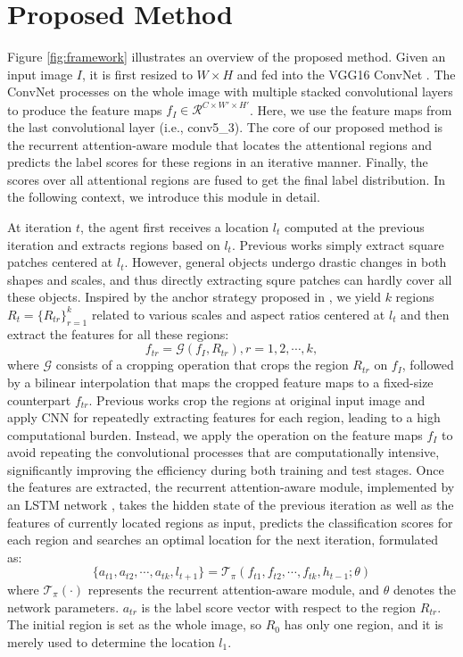 \documentclass[letterpaper]{article} %
\begin{document}
\section{Proposed Method}
Figure \ref{fig:framework} illustrates an overview of the proposed method. Given an input image $I$, it is first resized to $W\times{H}$ and fed into the VGG16 ConvNet \cite{simonyan2014very}. The ConvNet processes on the whole image with multiple stacked convolutional layers to produce the feature maps $f_I\in{\mathcal{R}^{C\times{W'}\times{H'}}}$. Here, we use the feature maps from the last convolutional layer (i.e., conv5\_3). The core of our proposed method is the recurrent attention-aware module that locates the attentional regions and predicts the label scores for these regions in an iterative manner. Finally, the scores over all attentional regions are fused to get the final label distribution. In the following context, we introduce this module in detail.

At iteration $t$, the agent first receives a location $l_t$ computed at the previous iteration and extracts regions based on $l_t$. Previous works \cite{mnih2014recurrent} simply extract square patches centered at $l_t$. However, general objects undergo drastic changes in both shapes and scales, and thus directly extracting squre patches can hardly cover all these objects. Inspired by the anchor strategy proposed in \cite{ren2015faster}, we yield $k$ regions $R_t=\{R_{tr}\}_{r=1}^k$ related to various scales and aspect ratios centered at $l_t$ and then extract the features for all these regions:
\begin{equation}
   f_{tr}=\mathcal{G}(f_I,R_{tr}), r=1,2,\cdots,k,
\end{equation}
where $\mathcal{G}$ consists of a cropping operation that crops the region $R_{tr}$ on $f_I$, followed by a bilinear interpolation that maps the cropped feature maps to a fixed-size counterpart $f_{tr}$. Previous works \cite{mnih2014recurrent} crop the regions at original input image and apply CNN for repeatedly extracting features for each region, leading to a high computational burden. Instead, we apply the operation on the feature maps $f_I$ to avoid repeating the convolutional processes that are computationally intensive, significantly improving the efficiency during both training and test stages. Once the features are extracted, the recurrent attention-aware module, implemented by an LSTM network \cite{hochreiter1997long}, takes the hidden state of the previous iteration as well as the features of currently located regions as input, predicts the classification scores for each region and searches an optimal location for the next iteration, formulated as:
\begin{equation}
   \{a_{t1},a_{t2},\cdots,a_{tk},l_{t+1}\}=\mathcal{T}_{\pi}(f_{t1},f_{t2},\cdots,f_{tk},h_{t-1};\theta)
\end{equation}
where $\mathcal{T}_{\pi}(\cdot)$ represents the recurrent attention-aware module, and $\theta$ denotes the network parameters. $a_{tr}$ is the label score vector with respect to the region $R_{tr}$. The initial region is set as the whole image, so $R_0$ has only one region, and it is merely used to determine the location $l_1$.
\end{document}
